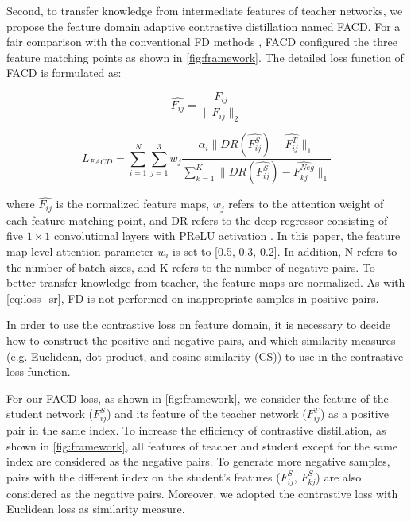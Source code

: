 \documentclass[10pt,twocolumn,letterpaper]{article}
\begin{document}
Second, to transfer knowledge from intermediate features of teacher networks, we propose the feature domain adaptive contrastive distillation named FACD. For a fair comparison with the conventional FD methods \cite{fakd, lsfd}, FACD configured the three feature matching points as shown in \cref{fig:framework}. The detailed loss function of FACD is formulated as: 


\begin{equation}
  \hat{F_{ij}} = \frac{F_{ij}}{\|F_{ij}\|_2}
  \label{eq:normal}
\end{equation}

\begin{equation}
  L_{FACD}=\sum_{i=1}^{N}{\sum_{j=1}^{3}{w_j\frac{\alpha_i\|DR(\hat{F_{ij}^S})-\hat{F_{ij}^T}\|_1}{\sum_{k=1}^{K}{\|DR(\hat{F_{ij}^S})-\hat{F_{kj}^{Neg}}\|_1}}}}
  \label{eq:loss_FACD}
\end{equation}

where \begin{math}\hat{F_{ij}}\end{math} is the normalized feature maps, \begin{math}w_j\end{math} refers to the attention weight of each feature matching point, and DR refers to the deep regressor consisting of five \begin{math}1\times1\end{math} convolutional layers with PReLU activation \cite{prelu}. In this paper, the feature map level attention parameter \begin{math}w_i\end{math} is set to [0.5, 0.3, 0.2]. In addition, N refers to the number of batch sizes, and K refers to the number of negative pairs. To better transfer knowledge from teacher, the feature maps are normalized. As with \cref{eq:loss_sr}, FD is not performed on inappropriate samples in positive pairs. 

In order to use the contrastive loss on feature domain, it is necessary to decide how to construct the positive and negative pairs, and which similarity measures (e.g. Euclidean, dot-product, and cosine similarity (CS)) to use in the contrastive loss function. 

For our FACD loss, as shown in \cref{fig:framework}, we consider the feature of the student network (\begin{math}F_{ij}^S\end{math}) and its feature of the teacher network (\begin{math}F_{ij}^T\end{math}) as a positive pair in the same index. To increase the efficiency of contrastive distillation, as shown in \cref{fig:framework}, all features of teacher and student except for the same index are considered as the negative pairs. To generate more negative samples, pairs with the different index on the student's features (\begin{math}F_{ij}^S\end{math}, \begin{math}F_{kj}^S\end{math}) are also considered as the negative pairs. Moreover, we adopted the contrastive loss with Euclidean loss as similarity measure. 
\end{document}
